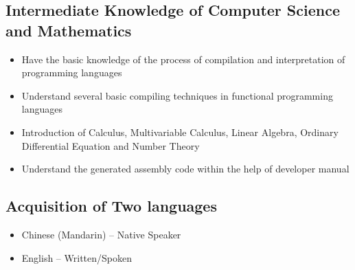 \documentclass{resume}
\begin{document}
\subsection{\textbf{Intermediate Knowledge of Computer Science and Mathematics}}
\begin{itemize}
\item Have the basic knowledge of the process of compilation and interpretation of programming languages
\item Understand several basic compiling techniques in functional programming languages
\item Introduction of Calculus, Multivariable Calculus, Linear Algebra, Ordinary Differential Equation and Number Theory
\item Understand the generated assembly code within the help of developer manual
\end{itemize}
\subsection{\textbf{Acquisition of Two languages}}
\begin{itemize}
\item Chinese (Mandarin) – Native Speaker
\item English – Written/Spoken
\end{itemize}
\end{document}
